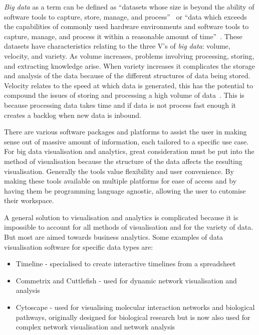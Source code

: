 \textit{Big data} as a term can be defined as ``datasets whose size is beyond the ability of software tools to capture, store, manage, and process''~\cite{manyika2011, Sneiderman1996} or ``data which exceeds the capabilities of commonly used hardware environments and software tools to capture, manage, and process it within a reasonable amount of time''~\cite{merv2011}.
These datasets have characteristics relating to the three V's of \textit{big data}: volume, velocity, and variety.
As volume increases, problems involving processing, storing, and extracting knowledge arise.
When variety increases it complicates the storage and analysis of the data because of the different structures of data being stored.
Velocity relates to the speed at which data is generated, this has the potential to compound the issues of storing and processing a high volume of data~\cite{Caldarola2017}.
This is because processing data takes time and if data is not process fast enough it creates a backlog when new data is inbound.

There are various software packages and platforms to assist the user in making sense out of massive amount of information, each tailored to a specific use case.
For big data visualisation and analytics, great consideration must be put into the method of visualisation because the structure of the data affects the resulting visualisation.
Generally the tools value flexibility and user convenience.
By making these tools available on multiple platforms for ease of access and by having them be programming language agnostic, allowing the user to cutomise their workspace.

A general solution to visualisation and analytics is complicated because it is impossible to account for all methods of visualisation and for the variety of data.
But most are aimed towards business analytics.
Some examples of data visualisation software for specific data types are:
\begin{itemize}
  \item Timeline - specialised to create interactive timelines from a spreadsheet
  \item Commetrix and Cuttlefish - used for dynamic network visualisation and analysis
  \item Cytoscape - used for visualising molecular interaction networks and biological pathways, originally designed for biological research but is now also used for complex network visualisation and network analysis
\end{itemize}

